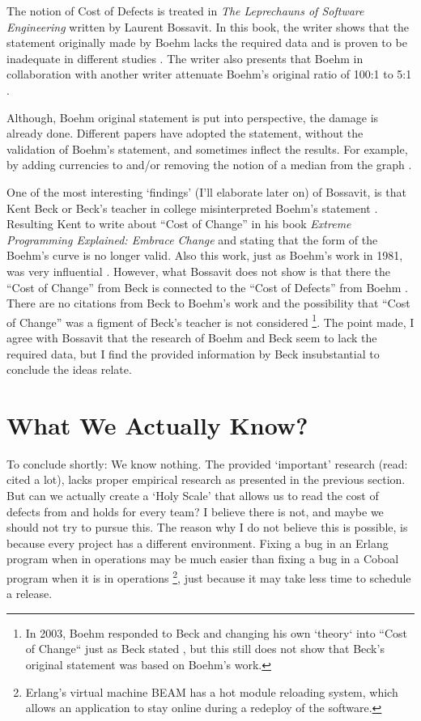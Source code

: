 The notion of Cost of Defects is treated in \textit{The Leprechauns of Software Engineering} \autocite{bossavit2013leprechauns} written by Laurent Bossavit.
In this book, the writer shows that the statement originally made by Boehm lacks the required data and is proven to be inadequate in different studies \autocite[98,102]{bossavit2013leprechauns}.
The writer also presents that Boehm in collaboration with another writer attenuate Boehm's original ratio of 100:1 to 5:1 \autocite[426]{boehm2005software}.

Although, Boehm original statement is put into perspective, the damage is already done.
Different papers have adopted the statement, without the validation of Boehm's statement, and sometimes inflect the results.
For example, by adding currencies to and/or removing the notion of a median from the graph \autocite{bossavit2013leprechauns}.

One of the most interesting `findings' (I'll elaborate later on) of Bossavit, is that Kent Beck or Beck's teacher in college misinterpreted Boehm's statement \autocite[97]{bossavit2013leprechauns} \autocite[21]{beck2000extreme}.
Resulting Kent to write about ``Cost of Change'' in his book \textit{Extreme Programming Explained: Embrace Change} \autocite{beck2000extreme} and stating that the form of the Boehm's curve is no longer valid.
Also this work, just as Boehm's work in 1981, was very influential \autocite{beck2000extreme} \autocite{boehm1981software}.
However, what Bossavit does not show is that there the ``Cost of Change'' from Beck is connected to the ``Cost of Defects'' from Boehm \autocite{bossavit2013leprechauns}.
There are no citations from Beck to Boehm's work and the possibility that ``Cost of Change'' was a figment of Beck's teacher is not considered \footnote{In 2003, Boehm responded to Beck and changing his own `theory` into ``Cost of Change`` just as Beck stated \autocite{boehm2003balancing}, but this still does not show that Beck's original statement was based on Boehm's work.}.
The point made, I agree with Bossavit that the research of Boehm and Beck seem to lack the required data,
but I find the provided information by Beck insubstantial to conclude the ideas relate.

\section*{What We Actually Know?}

To conclude shortly: We know nothing.
The provided `important' research (read: cited a lot), lacks proper empirical research as presented in the previous section.
But can we actually create a `Holy Scale' that allows us to read the cost of defects from and holds for every team?
I believe there is not, and maybe we should not try to pursue this.
The reason why I do not believe this is possible, is because every project has a different environment.
Fixing a bug in an Erlang program when in operations may be much easier than fixing a bug in a Coboal program when it is in operations
\footnote{Erlang's virtual machine BEAM has a hot module reloading system, which allows an application to stay online during a redeploy of the software.},
just because it may take less time to schedule a release.

